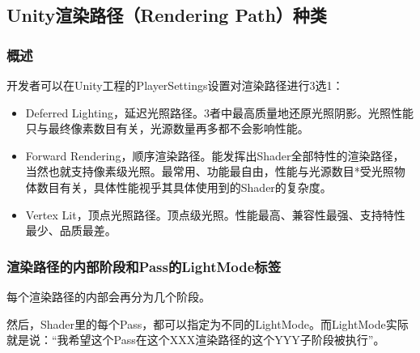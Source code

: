 \documentclass[9pt, b5paper]{article}
\begin{document}
\subsection{Unity渲染路径（Rendering Path）种类}
\label{sec:org8536b61}
\subsubsection{概述}
\label{sec:org2d79479}
开发者可以在Unity工程的PlayerSettings设置对渲染路径进行3选1：

\begin{itemize}
\item Deferred Lighting，延迟光照路径。3者中最高质量地还原光照阴影。光照性能只与最终像素数目有关，光源数量再多都不会影响性能。
\item Forward Rendering，顺序渲染路径。能发挥出Shader全部特性的渲染路径，当然也就支持像素级光照。最常用、功能最自由，性能与光源数目*受光照物体数目有关，具体性能视乎其具体使用到的Shader的复杂度。
\item Vertex Lit，顶点光照路径。顶点级光照。性能最高、兼容性最强、支持特性最少、品质最差。
\end{itemize}
\subsubsection{渲染路径的内部阶段和Pass的LightMode标签}
\label{sec:org767a1cd}

每个渲染路径的内部会再分为几个阶段。

然后，Shader里的每个Pass，都可以指定为不同的LightMode。而LightMode实际就是说：“我希望这个Pass在这个XXX渲染路径的这个YYY子阶段被执行”。
\end{document}
